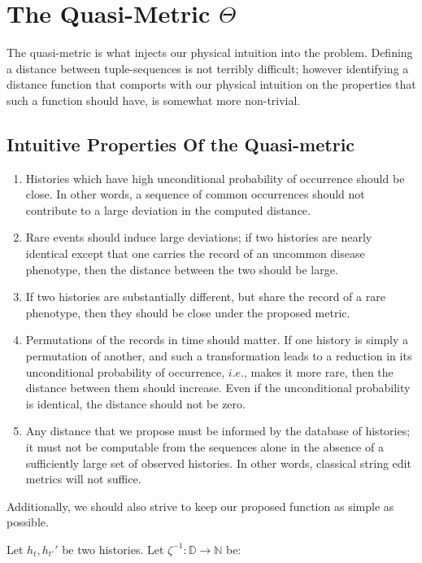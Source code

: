 \documentclass[twocolumn, compsoc,9pt]{IEEEtran}
\newcommand{\D}{\mathbb{D}}
\newcommand{\T}{\mathcal{T}}
\begin{document}
{%
\section{The Quasi-Metric $\Theta$}
The quasi-metric is what injects our physical intuition into the problem. Defining a distance between tuple-sequences is not terribly difficult; however identifying a distance function that comports with our physical intuition on the properties that such a function should have, is somewhat more non-trivial.

\subsection{Intuitive Properties Of the Quasi-metric}
\begin{enumerate}
\item Histories which have high unconditional probability of occurrence should be close. In other words, a sequence of common occurrences should not contribute to a large deviation in the computed distance.
\item Rare events should induce  large deviations; if two histories are nearly identical except that one carries the record of an uncommon disease phenotype, then the distance between the two should be large.
 \item  If two histories are substantially different, but share the record of a  rare phenotype, then they should be close under the proposed metric.
\item Permutations of the records in time  should matter. If one history is simply a permutation of another, and such a transformation leads to a reduction in its unconditional probability of occurrence, $i.e.$, makes it more rare, then the distance between them should increase. Even if the unconditional probability is identical, the distance should not be zero.
\item Any distance that we propose must be informed by the database of histories; it must not be computable from the sequences alone in the absence of a  sufficiently large set of observed histories. In other words, classical string edit metrics will not suffice.
\end{enumerate}
Additionally, we should also strive to keep our proposed function as simple as possible. 
%
\begin{defn}\label{defmetric}
Let $h_t,h_{t'}'$ be two histories. Let  $\zeta^{-1}:\D \rightarrow \mathbb{N}
$ be:
\cgather{
\forall d \in \D, t \in \T,  \zeta^{-1}((t,d)) = \left \lceil \frac{1}{\zeta(d)} \right \rceil^\gamma, \gamma > 1, \gamma \in \mathbb{N}
}
\end{defn}}
\end{document}
